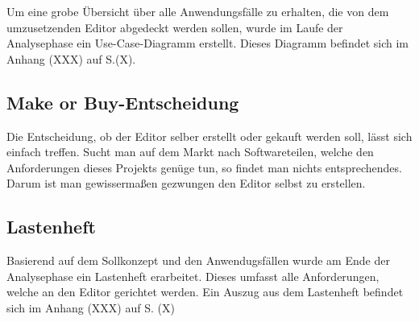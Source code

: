 Um eine grobe Übersicht über alle Anwendungsfälle zu erhalten, die von dem umzusetzenden Editor
abgedeckt werden sollen, wurde im Laufe der Analysephase ein Use-Case-Diagramm erstellt. Dieses
Diagramm befindet sich im Anhang (XXX) auf S.(X).

\subsection{\glqq Make or Buy\grqq -Entscheidung}
Die Entscheidung, ob der Editor selber erstellt oder gekauft werden soll, lässt sich einfach treffen. Sucht man auf dem Markt nach Softwareteilen, welche den Anforderungen dieses Projekts genüge tun, so findet man nichts entsprechendes. Darum ist man gewissermaßen gezwungen den Editor selbst zu erstellen.

\subsection{Lastenheft}

Basierend auf dem Sollkonzept und den Anwendugsfällen wurde am Ende der Analysephase ein Lastenheft erarbeitet. Dieses umfasst alle Anforderungen, welche an den Editor gerichtet werden. Ein Auszug aus dem Lastenheft befindet sich im Anhang (XXX) auf S. (X)

\newpage
